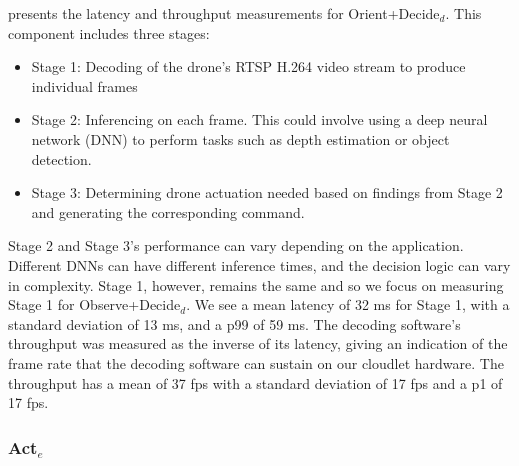  presents the latency and throughput measurements
for Orient+Decide$_d$. This component includes three stages:

\begin{itemize}
\item Stage 1: Decoding of the drone's RTSP H.264 video stream to produce
    individual frames
\item Stage 2: Inferencing on each frame. This could involve using a deep
    neural network (DNN) to perform tasks such as depth estimation or object
    detection.
\item Stage 3: Determining drone actuation needed based on findings from Stage
    2 and generating the corresponding command.
\end{itemize}

Stage 2 and Stage 3's performance can vary depending on the application.
Different DNNs can have different inference times, and the decision logic can
vary in complexity.  Stage 1, however, remains the same and so we focus on
measuring Stage 1 for Observe+Decide$_d$. We see a mean latency of 32 ms for
Stage 1, with a standard deviation of 13 ms, and a p99 of 59 ms. The decoding
software's throughput was measured as the inverse of its latency, giving an
indication of the frame rate that the decoding software can sustain on our
cloudlet hardware. The throughput has a mean of 37 fps with a standard
deviation of 17 fps and a p1 of 17 fps.

\subsubsection{Act$_e$}

